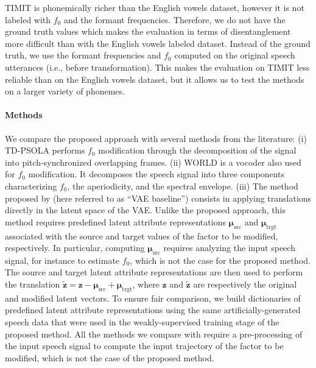 \documentclass[review]{elsarticle}
\begin{document}
TIMIT is phonemically richer than the English vowels dataset, however it is not labeled with $f_0$ and the formant frequencies. Therefore, we do not have the ground truth values which makes the evaluation in terms of disentanglement more difficult than with the English vowels labeled dataset. Instead of the ground truth, we use the formant frequencies and $f_0$ computed on the original speech utterances (i.e., before transformation). This makes the evaluation on TIMIT less reliable than on the English vowels dataset, but it allows us to test the methods on a larger variety of phonemes.

\paragraph{Methods} We compare the proposed approach with several methods from the literature: (i) TD-PSOLA \citep{moulines1990pitch} performs $f_0$ modification through the decomposition of the signal into pitch-synchronized overlapping frames. (ii) WORLD \citep{morise2016world} is a vocoder also used for $f_0$ modification. It decomposes the speech signal into three components characterizing $f_0$, the aperiodicity, and the spectral envelope. (iii) The method proposed by \cite{hsu2017learning} (here referred to as ``VAE baseline'') consists in applying translations directly in the latent space of the VAE. Unlike the proposed approach, this method requires predefined latent attribute representations $\boldsymbol{\mu}_{\text{src}}$ and $\boldsymbol{\mu}_{\text{trgt}}$ associated with the source and target values of the factor to be modified, respectively. In particular, computing $\boldsymbol{\mu}_{\text{src}}$ requires analyzing the input speech signal, for instance to estimate $f_0$, which is not the case for the proposed method. The source and target latent attribute representations are then used to perform the translation $\tilde{\mathbf{z}} = \mathbf{z} - \boldsymbol{\mu}_{\text{src}} + \boldsymbol{\mu}_{\text{trgt}}$, where $\mathbf{z}$ and $\tilde{\mathbf{z}}$ are respectively the original and modified latent vectors. To ensure fair comparison, we build dictionaries of predefined latent attribute representations using the same artificially-generated speech data that were used in the weakly-supervised training stage of the proposed method. All the methods we compare with require a pre-processing of the input speech signal to compute the input trajectory of the factor to be modified, which is not the case of the proposed method.
\end{document}
